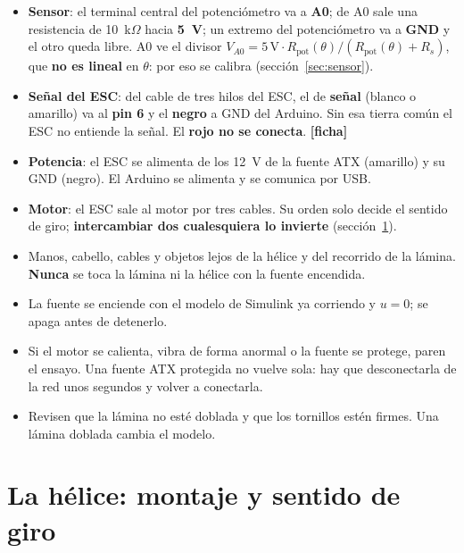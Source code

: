 \documentclass[11pt,letterpaper]{article}
\newcommand{\ficha}{\textcolor{verdeOK}{\textbf{[ficha]}}}  %
\begin{document}
\begin{itemize}[leftmargin=12pt]
  \item \textbf{Sensor}: el terminal central del potenciómetro va a \textbf{A0}; de A0 sale una resistencia de 10~k$\Omega$ hacia \textbf{5~V}; un extremo del potenciómetro va a \textbf{GND} y el otro queda libre. A0 ve el divisor $V_{A0}=5\,\text{V}\cdot R_\text{pot}(\theta)/(R_\text{pot}(\theta)+R_s)$, que \textbf{no es lineal} en $\theta$: por eso se calibra (sección~\ref{sec:sensor}).
  \item \textbf{Señal del ESC}: del cable de tres hilos del ESC, el de \textbf{señal} (blanco o amarillo) va al \textbf{pin 6} y el \textbf{negro} a GND del Arduino. Sin esa tierra común el ESC no entiende la señal. El \textbf{rojo no se conecta}. \ficha
  \item \textbf{Potencia}: el ESC se alimenta de los 12~V de la fuente ATX (amarillo) y su GND (negro). El Arduino se alimenta y se comunica por USB.
  \item \textbf{Motor}: el ESC sale al motor por tres cables. Su orden solo decide el sentido de giro; \textbf{intercambiar dos cualesquiera lo invierte} (sección~\ref{sec:helice}).
\end{itemize}

\begin{peligro}
\begin{itemize}[leftmargin=12pt]
  \item Manos, cabello, cables y objetos lejos de la hélice y del recorrido de la lámina. \textbf{Nunca} se toca la lámina ni la hélice con la fuente encendida.
  \item La fuente se enciende con el modelo de Simulink ya corriendo y $u=0$; se apaga antes de detenerlo.
  \item Si el motor se calienta, vibra de forma anormal o la fuente se protege, paren el ensayo. Una fuente ATX protegida no vuelve sola: hay que desconectarla de la red unos segundos y volver a conectarla.
  \item Revisen que la lámina no esté doblada y que los tornillos estén firmes. Una lámina doblada cambia el modelo.
\end{itemize}
\end{peligro}

\section{La hélice: montaje y sentido de giro}\label{sec:helice}
\end{document}
